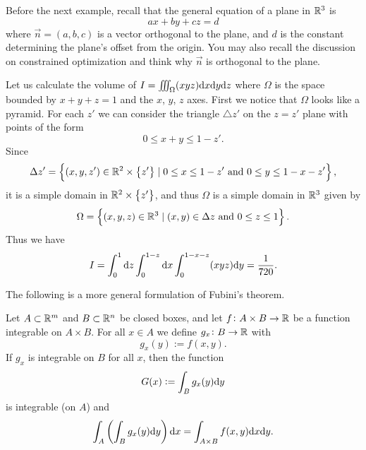 \documentclass[11pt,a4paper]{article}
\begin{document}
\begin{remark}
  Before the next example, recall that the general equation of a plane
  in $\mathbb{R}^3$ is
  \[
    ax + by + cz = d
  \]
  where $\vec n = (a,b,c)$ is a vector orthogonal to the plane,
  and $d$ is the constant determining the plane's offset from the origin.
  You may also recall the discussion on constrained optimization
  and think why $\vec n$ is orthogonal to the plane.
\end{remark}

\begin{example}
  Let us calculate the volume of $I = \iiint_{\Omega} (xyz) \dx \dy \dz$
  where $\Omega$ is the space bounded by $x + y + z = 1$ and the
  $x$, $y$, $z$ axes.
  First we notice that $\Omega$ looks like a pyramid.
  For each $z'$ we can consider the triangle $\triangle z'$
  on the $z = z'$ plane with points of the form
  \[
    0 \le x + y \le 1 - z'.
  \]
  Since
  \[
    \Delta z' =
    \left\{(x,y,z') \in \mathbb{R}^2 \times \left\{z'\right\} \mid 0 \le x \le 1 - z'
      \text{ and } 0 \le y \le 1 - x - z'\right\},
  \]
  it is a simple domain in $\mathbb{R}^2 \times \left\{z'\right\}$,
  and thus $\Omega$ is a simple domain in $\mathbb{R}^3$ given by
  \[
    \Omega =
    \left\{(x,y,z) \in \mathbb{R}^3 \mid (x,y) \in \Delta z \text{ and } 0 \le z \le 1\right\}.
  \]
  Thus we have
  \[
    I =
    \int_{0}^{1} \dz \int_{0}^{1-z} \dx \int_{0}^{1-x-z} (xyz) \dy =
    \frac{1}{720}.
  \]
\end{example}

\begin{remark}
  The following is a more general formulation of Fubini's theorem.
\end{remark}

\begin{theorem}
  Let $A \subset \mathbb{R}^m$ and $B \subset \mathbb{R}^n$ be closed boxes,
  and let $f \colon A \times B \to \mathbb{R}$ be a function integrable on
  $A \times B$.
  For all $x \in A$ we define $g_x \colon B \to \mathbb{R}$ with
  \[
    g_x(y) := f(x,y).
  \]
  If $g_x$ is integrable on $B$ for all $x$, then the function
  \[
    G(x) := \int_B g_x(y) \dy
  \]
  is integrable (on $A$) and
  \[
    \int_A \del{\int_B g_x(y) \dy} \dx =
    \int_{A \times B} f(x,y) \dx \dy.
  \]
\end{theorem}
\end{document}
